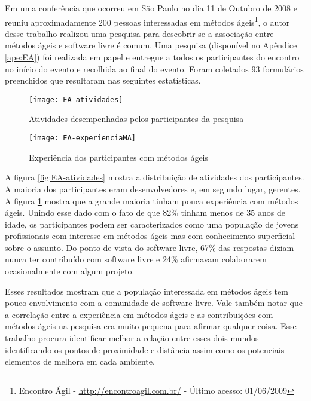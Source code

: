 Em uma conferência que ocorreu em São Paulo no dia 11 de Outubro de
2008 e reuniu aproximadamente 200 pessoas interessadas em métodos
ágeis\footnote{Encontro Ágil - \url{http://encontroagil.com.br/} -
  Último acesso: 01/06/2009}, o autor desse trabalho realizou uma
pesquisa para descobrir se a associação entre métodos ágeis e software
livre é comum. Uma pesquisa (disponível no Apêndice \ref{ape:EA}) foi
realizada em papel e entregue a todos os participantes do encontro no
início do evento e recolhida ao final do evento. Foram coletados 93
formulários preenchidos que resultaram nas seguintes estatísticas.


\begin{figure}[htb]
  \begin{minipage}[t]{0.5\linewidth}
    \centering
    \texttt{[image: EA-atividades]}
    \caption{Atividades desempenhadas pelos participantes da pesquisa}
    \label{fig:EA-atividades}
  \end{minipage}
  \begin{minipage}[t]{0.5\linewidth}
    \centering
    \texttt{[image: EA-experienciaMA]}
    \caption{Experiência dos participantes com métodos ágeis}
    \label{fig:EA-experienciaMA}
  \end{minipage}
\end{figure}

A figura \ref{fig:EA-atividades} mostra a distribuição de atividades
dos participantes. A maioria dos participantes eram desenvolvedores e,
em segundo lugar, gerentes. A figura \ref{fig:EA-experienciaMA} mostra
que a grande maioria tinham pouca experiência com métodos
ágeis. Unindo esse dado com o fato de que 82\% tinham menos de 35 anos
de idade, os participantes podem ser caracterizados como uma população
de jovens profissionais com interesse em métodos ágeis mas com
conhecimento superficial sobre o assunto. Do ponto de vista do
software livre, 67\% das respostas diziam nunca ter contribuído com
software livre e 24\% afirmavam colaborarem ocasionalmente com algum
projeto.

Esses resultados mostram que a população interessada em métodos ágeis
tem pouco envolvimento com a comunidade de software livre. Vale também
notar que a correlação entre a experiência em métodos ágeis e as
contribuições com métodos ágeis na pesquisa era muito pequena para
afirmar qualquer coisa. Esse trabalho procura identificar melhor a
relação entre esses dois mundos identificando os pontos de proximidade
e distância assim como os potenciais elementos de melhora em cada
ambiente.

